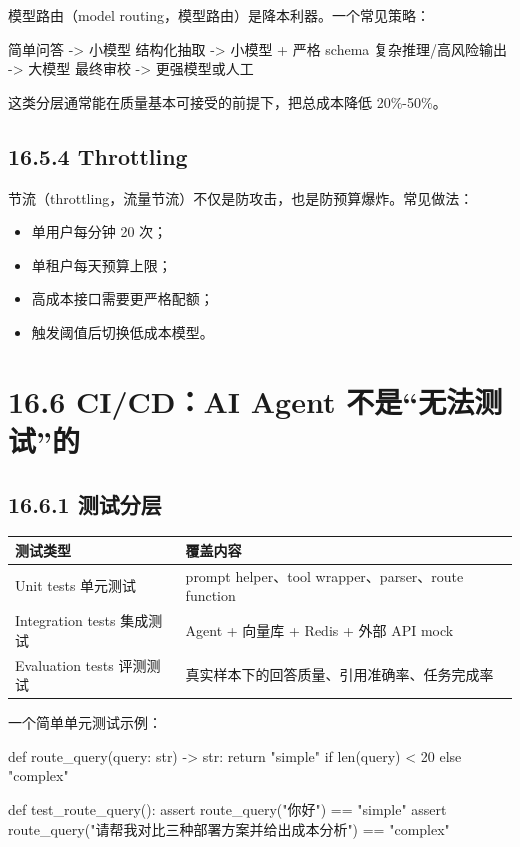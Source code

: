 模型路由（model routing，模型路由）是降本利器。一个常见策略：


\begin{codeblock}
简单问答 -> 小模型
结构化抽取 -> 小模型 + 严格 schema
复杂推理/高风险输出 -> 大模型
最终审校 -> 更强模型或人工
\end{codeblock}

这类分层通常能在质量基本可接受的前提下，把总成本降低 20\%-50\%。


\subsection{16.5.4 Throttling}

节流（throttling，流量节流）不仅是防攻击，也是防预算爆炸。常见做法：


\begin{itemize}[leftmargin=2em]
\item 单用户每分钟 20 次；
\item 单租户每天预算上限；
\item 高成本接口需要更严格配额；
\item 触发阈值后切换低成本模型。
\end{itemize}

\section{16.6 CI/CD：AI Agent 不是``无法测试''的}

\subsection{16.6.1 测试分层}

\begingroup
\scriptsize
\setlength{\tabcolsep}{3pt}
\begin{longtable}{|p{}|p{}|}
\hline
测试类型 & 覆盖内容 \\ \hline
Unit tests 单元测试 & prompt helper、tool wrapper、parser、route function \\ \hline
Integration tests 集成测试 & Agent + 向量库 + Redis + 外部 API mock \\ \hline
Evaluation tests 评测测试 & 真实样本下的回答质量、引用准确率、任务完成率 \\ \hline
\end{longtable}
\endgroup

一个简单单元测试示例：


\begin{codeblock}
def route_query(query: str) -> str:
    return "simple" if len(query) < 20 else "complex"

def test_route_query():
    assert route_query("你好") == "simple"
    assert route_query("请帮我对比三种部署方案并给出成本分析") == "complex"
\end{codeblock}

